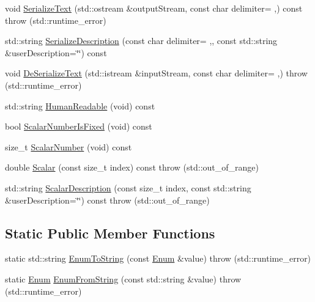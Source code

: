 \begin{DoxyCompactItemize}
\item 
void \hyperlink{classmts_component_state_a27d4817df03edad9c0fb37fd3ec5235e}{Serialize\+Text} (std\+::ostream \&output\+Stream, const char delimiter= \textquotesingle{},\textquotesingle{}) const   throw (std\+::runtime\+\_\+error)
\item 
std\+::string \hyperlink{classmts_component_state_a26daef23e5f1a036728b0b14b9e8efc0}{Serialize\+Description} (const char delimiter= \textquotesingle{},\textquotesingle{}, const std\+::string \&user\+Description=\char`\"{}\char`\"{}) const 
\item 
void \hyperlink{classmts_component_state_a5be1810d0081c6bd88eabd7ba133cd3d}{De\+Serialize\+Text} (std\+::istream \&input\+Stream, const char delimiter= \textquotesingle{},\textquotesingle{})  throw (std\+::runtime\+\_\+error)
\item 
std\+::string \hyperlink{classmts_component_state_a372b7626577a0578549f39af8ec4f788}{Human\+Readable} (void) const 
\item 
bool \hyperlink{classmts_component_state_af8090a197fd5b545a9da6c0f4ae00bdf}{Scalar\+Number\+Is\+Fixed} (void) const 
\item 
size\+\_\+t \hyperlink{classmts_component_state_a57ed439d6865af04c20a3a561b96be9d}{Scalar\+Number} (void) const 
\item 
double \hyperlink{classmts_component_state_a65e258793958233b43d67c91fd9e3f2c}{Scalar} (const size\+\_\+t index) const   throw (std\+::out\+\_\+of\+\_\+range)
\item 
std\+::string \hyperlink{classmts_component_state_ac6de4699d77e38e562e7fa887524d77b}{Scalar\+Description} (const size\+\_\+t index, const std\+::string \&user\+Description=\char`\"{}\char`\"{}) const   throw (std\+::out\+\_\+of\+\_\+range)
\end{DoxyCompactItemize}
\subsection*{Static Public Member Functions}
\begin{DoxyCompactItemize}
\item 
static std\+::string \hyperlink{classmts_component_state_a5ca8cf9c8a890e2b25accfc4876701bf}{Enum\+To\+String} (const \hyperlink{classmts_component_state_a1158e4d2d79fff671354909e87f58928}{Enum} \&value)  throw (std\+::runtime\+\_\+error)
\item 
static \hyperlink{classmts_component_state_a1158e4d2d79fff671354909e87f58928}{Enum} \hyperlink{classmts_component_state_a2ee830f3b77c18252834530063aa1250}{Enum\+From\+String} (const std\+::string \&value)  throw (std\+::runtime\+\_\+error)
\end{DoxyCompactItemize}
